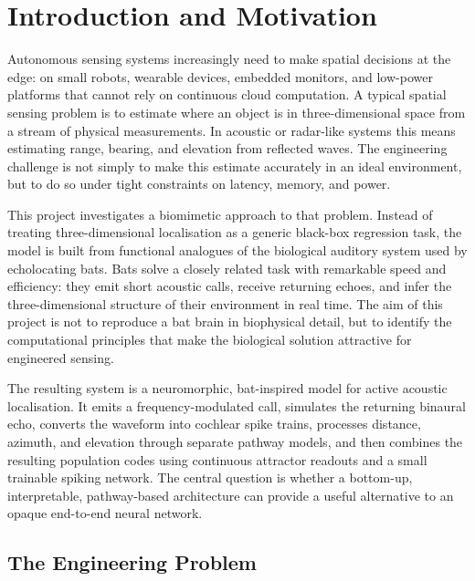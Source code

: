 \chapter{Introduction and Motivation}

Autonomous sensing systems increasingly need to make spatial decisions at the edge: on small robots, wearable devices, embedded monitors, and low-power platforms that cannot rely on continuous cloud computation. A typical spatial sensing problem is to estimate where an object is in three-dimensional space from a stream of physical measurements. In acoustic or radar-like systems this means estimating range, bearing, and elevation from reflected waves. The engineering challenge is not simply to make this estimate accurately in an ideal environment, but to do so under tight constraints on latency, memory, and power.

This project investigates a biomimetic approach to that problem. Instead of treating three-dimensional localisation as a generic black-box regression task, the model is built from functional analogues of the biological auditory system used by echolocating bats. Bats solve a closely related task with remarkable speed and efficiency: they emit short acoustic calls, receive returning echoes, and infer the three-dimensional structure of their environment in real time. The aim of this project is not to reproduce a bat brain in biophysical detail, but to identify the computational principles that make the biological solution attractive for engineered sensing.

The resulting system is a neuromorphic, bat-inspired model for active acoustic localisation. It emits a frequency-modulated call, simulates the returning binaural echo, converts the waveform into cochlear spike trains, processes distance, azimuth, and elevation through separate pathway models, and then combines the resulting population codes using continuous attractor readouts and a small trainable spiking network. The central question is whether a bottom-up, interpretable, pathway-based architecture can provide a useful alternative to an opaque end-to-end neural network.

\section{The Engineering Problem}

